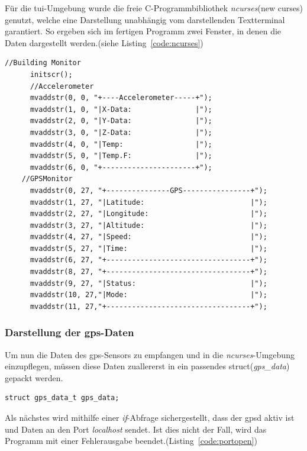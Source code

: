 Für die \ac{tui}-Umgebung wurde die freie C-Programmbibliothek \emph{ncurses}(new curses) genutzt, welche eine Darstellung
unabhängig vom darstellenden Textterminal garantiert. So ergeben sich im fertigen Programm zwei Fenster, in denen
die Daten dargestellt werden.(siehe Listing~\ref{code:ncurses})

\lstset{language=C}
\begin{lstlisting}[caption={Darstellung der \ac{tui} via ncurses},label={code:ncurses}]
  //Building Monitor
      initscr();
      //Accelerometer
      mvaddstr(0, 0, "+----Accelerometer-----+");
      mvaddstr(1, 0, "|X-Data:               |");
      mvaddstr(2, 0, "|Y-Data:               |");
      mvaddstr(3, 0, "|Z-Data:               |");
      mvaddstr(4, 0, "|Temp:                 |");
      mvaddstr(5, 0, "|Temp.F:               |");
      mvaddstr(6, 0, "+----------------------+");
    //GPSMonitor
      mvaddstr(0, 27, "+---------------GPS----------------+");
      mvaddstr(1, 27, "|Latitude:                         |");
      mvaddstr(2, 27, "|Longitude:                        |");
      mvaddstr(3, 27, "|Altitude:                         |");
      mvaddstr(4, 27, "|Speed:                            |");
      mvaddstr(5, 27, "|Time:                             |");
      mvaddstr(6, 27, "+----------------------------------+");
      mvaddstr(8, 27, "+----------------------------------+");
      mvaddstr(9, 27, "|Status:                           |");
      mvaddstr(10, 27,"|Mode:                             |");
      mvaddstr(11, 27,"+----------------------------------+");
 \end{lstlisting}

\subsubsection{Darstellung der \ac{gps}-Daten}\label{kap:darstellunggps}


Um nun die Daten des \ac{gps}-Sensors zu empfangen und in die \emph{ncurses}-Umgebung einzupflegen, müssen diese
Daten zuallererst in ein passendes struct(\emph{gps\_data}) gepackt werden. \\

\lstset{language=C}
\begin{lstlisting}[caption={Erstellen eines Structs für die \ac{gps}-Daten},label={code:gpsstruct}]
struct gps_data_t gps_data;
 \end{lstlisting}

Als nächstes wird mithilfe einer \emph{if}-Abfrage sichergestellt, dass der \ac{gpsd} aktiv ist
und Daten an den Port \emph{localhost} sendet. Ist dies nicht der Fall, wird das Programm mit
einer Fehlerausgabe beendet.(Listing~\ref{code:portopen})\\

